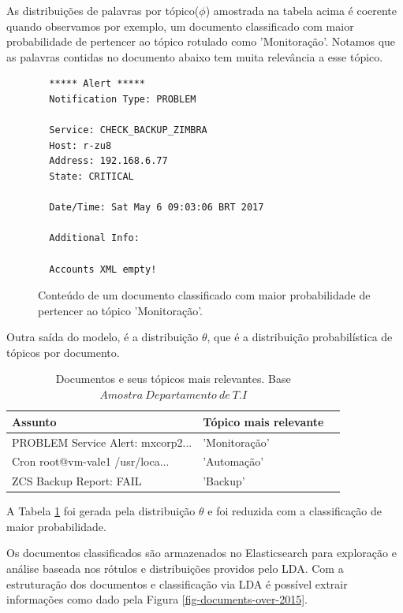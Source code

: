 \documentclass[12pt,a4paper]{article}
\begin{document}
As distribuições de palavras por tópico($\phi$) amostrada na tabela acima é coerente quando observamos por exemplo, um documento classificado com maior
 probabilidade de pertencer ao tópico rotulado como 'Monitoração'. Notamos que as palavras contidas no documento abaixo tem muita relevância a esse tópico.


\begin{figure}[H]
  \scriptsize
  \begin{verbatim}
  ***** Alert *****
  Notification Type: PROBLEM

  Service: CHECK_BACKUP_ZIMBRA
  Host: r-zu8
  Address: 192.168.6.77
  State: CRITICAL

  Date/Time: Sat May 6 09:03:06 BRT 2017

  Additional Info:

  Accounts XML empty!
  \end{verbatim}
  \normalsize
  \caption{Conteúdo de um documento classificado com maior probabilidade de pertencer ao tópico 'Monitoração'.}
  \label{mo}
\end{figure}

Outra saída do modelo, é a distribuição $\theta$, que é a distribuição probabilística de tópicos por documento.

\begin{table}[H]
  \centering
  \begin{tabular}{lll}
  Assunto                               & Tópico mais relevante \\
  \hline
  PROBLEM Service Alert: mxcorp2...     & 'Monitoração' \\
  Cron root@vm-vale1 /usr/loca...       & 'Automação' \\
  ZCS Backup Report: FAIL               & 'Backup' \\
  \hline
  \end{tabular}
  \caption{Documentos e seus tópicos mais relevantes. Base $Amostra\ Departamento\ de\ T.I$}
  \label{tab-nich-documents}
\end{table}

A Tabela \ref{tab-nich-documents} foi gerada pela distribuição $\theta$ e foi reduzida com a classificação de maior 
 probabilidade.

Os documentos classificados são armazenados no Elasticsearch para exploração e análise baseada 
 nos rótulos e distribuições providos pelo LDA. Com a estruturação dos documentos e classificação via LDA é possível extrair informações como 
 dado pela Figura \ref{fig-documents-over-2015}.
\end{document}
